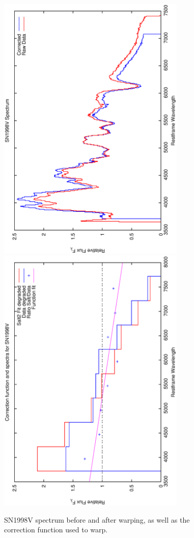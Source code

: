 \clearpage

\begin{figure}[p]
\centering
\includegraphics[angle=-90,width=0.8\textwidth]{./figures/spectrabeforeafter/SN1998V_handpicked_v001_v023_before_after_spectra.ps}
\hfill
\includegraphics[angle=-90,width=0.8\textwidth]{./figures/corrections/SN1998V_v001_correction.ps}
\hfill
\caption{SN1998V spectrum before and after warping, as well as the correction function used to warp.}
\label{fig:SN1998Vfour1}
\end{figure}


